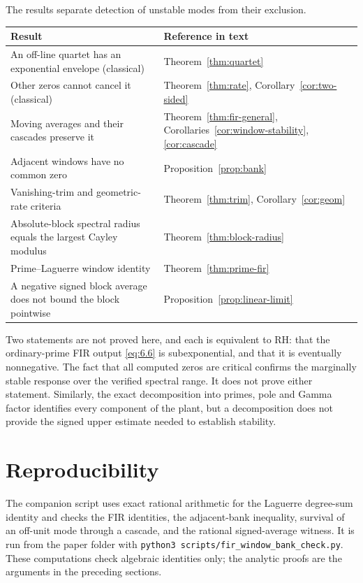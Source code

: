 \documentclass[11pt]{amsart}
\numberwithin{equation}{section}
\theoremstyle{definition}
\theoremstyle{remark}
\begin{document}
The results separate detection of unstable modes from their exclusion.

\begin{center}
\begin{tabular}{p{}p{}}
\toprule
Result & Reference in text\\
\midrule
An off-line quartet has an exponential envelope (classical) &
  Theorem~\ref{thm:quartet}\\
Other zeros cannot cancel it (classical) &
  Theorem~\ref{thm:rate}, Corollary~\ref{cor:two-sided}\\
Moving averages and their cascades preserve it &
  Theorem~\ref{thm:fir-general}, Corollaries~\ref{cor:window-stability},
  \ref{cor:cascade}\\
Adjacent windows have no common zero & Proposition~\ref{prop:bank}\\
Vanishing-trim and geometric-rate criteria &
  Theorem~\ref{thm:trim}, Corollary~\ref{cor:geom}\\
Absolute-block spectral radius equals the largest Cayley modulus &
  Theorem~\ref{thm:block-radius}\\
Prime--Laguerre window identity & Theorem~\ref{thm:prime-fir}\\
A negative signed block average does not bound the block pointwise &
  Proposition~\ref{prop:linear-limit}\\
\bottomrule
\end{tabular}
\end{center}

Two statements are not proved here, and each is equivalent to RH: that the
ordinary-prime FIR output \eqref{eq:6.6} is subexponential, and that it is
eventually nonnegative. The fact that all computed zeros are critical
confirms the marginally stable response over the verified spectral range.
It does not prove either statement. Similarly, the exact decomposition into primes, pole and
Gamma factor identifies every component of the plant, but a decomposition
does not provide the signed upper estimate needed to establish stability.

\section{Reproducibility}

The companion script  uses exact rational arithmetic for the Laguerre degree-sum identity and
checks the FIR identities, the adjacent-bank inequality, survival of an
off-unit mode through a cascade, and the rational signed-average witness.
It is run from the paper folder with
\texttt{python3 scripts/fir\_window\_bank\_check.py}.
These computations check algebraic identities only; the analytic proofs are
the arguments in the preceding sections.
\end{document}
